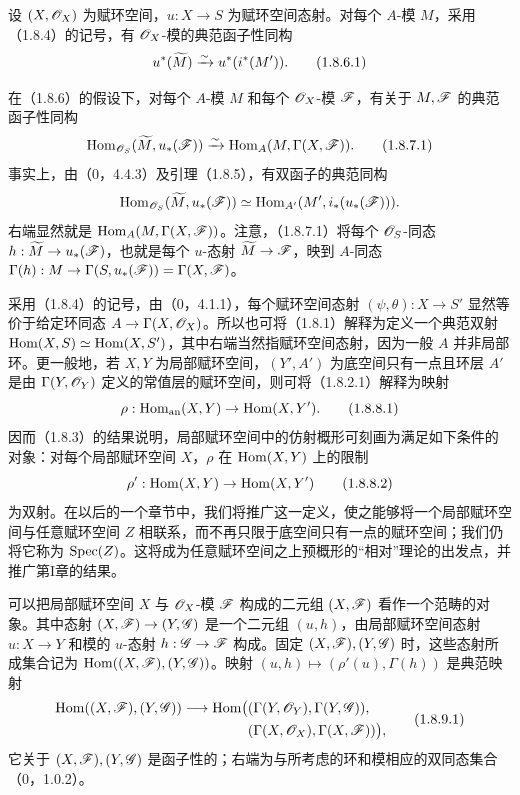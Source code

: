设 $(X,\mathscr O_X)$ 为赋环空间，$u:X\to S$ 为赋环空间态射。对每个 $A$-模 $M$，采用（1.8.4）的记号，有 $\mathscr O_X$-模的典范函子性同构
\begin{equation}u^*(\widetilde{M})\xrightarrow{\sim}u^*(i^*(M')).\tag{1.8.6.1}\end{equation}

在（1.8.6）的假设下，对每个 $A$-模 $M$ 和每个 $\mathscr O_X$-模 $\mathscr F$，有关于 $M,\mathscr F$ 的典范函子性同构
\begin{equation}
\operatorname{Hom}_{\mathscr O_S}(\widetilde{M},u_*(\mathscr F))\xrightarrow{\sim}
\operatorname{Hom}_A(M,\Gamma(X,\mathscr F)).\tag{1.8.7.1}
\end{equation}
事实上，由（0，4.4.3）及引理（1.8.5），有双函子的典范同构
\[
\operatorname{Hom}_{\mathscr O_S}(\widetilde{M},u_*(\mathscr F))\simeq
\operatorname{Hom}_{A'}(M',i_*(u_*(\mathscr F))).
\]
右端显然就是 $\operatorname{Hom}_A(M,\Gamma(X,\mathscr F))$。注意，（1.8.7.1）将每个 $\mathscr O_S$-同态 $h:\widetilde{M}\to u_*(\mathscr F)$，也就是每个 $u$-态射 $\widetilde{M}\to\mathscr F$，映到 $A$-同态
$\Gamma(h):M\to\Gamma(S,u_*(\mathscr F))=\Gamma(X,\mathscr F)$。

采用（1.8.4）的记号，由（0，4.1.1），每个赋环空间态射 $(\psi,\theta):X\to S'$ 显然等价于给定环同态 $A\to\Gamma(X,\mathscr O_X)$。所以也可将（1.8.1）解释为定义一个典范双射
$\operatorname{Hom}(X,S)\simeq\operatorname{Hom}(X,S')$，其中右端当然指赋环空间态射，因为一般 $A$ 并非局部环。更一般地，若 $X,Y$ 为局部赋环空间，$(Y',A')$ 为底空间只有一点且环层 $A'$ 是由 $\Gamma(Y,\mathscr O_Y)$ 定义的常值层的赋环空间，则可将（1.8.2.1）解释为映射
\begin{equation}\rho:\operatorname{Hom}_{\mathrm{an}}(X,Y)\to\operatorname{Hom}(X,Y').\tag{1.8.8.1}\end{equation}
因而（1.8.3）的结果说明，局部赋环空间中的仿射概形可刻画为满足如下条件的对象：对每个局部赋环空间 $X$，$\rho$ 在 $\operatorname{Hom}(X,Y)$ 上的限制
\begin{equation}\rho':\operatorname{Hom}(X,Y)\to\operatorname{Hom}(X,Y')\tag{1.8.8.2}\end{equation}
为双射。在以后的一个章节中，我们将推广这一定义，使之能够将一个局部赋环空间与任意赋环空间 $Z$ 相联系，而不再只限于底空间只有一点的赋环空间；我们仍将它称为 $\operatorname{Spec}(Z)$。这将成为任意赋环空间之上预概形的“相对”理论的出发点，并推广第I章的结果。

可以把局部赋环空间 $X$ 与 $\mathscr O_X$-模 $\mathscr F$ 构成的二元组 $(X,\mathscr F)$ 看作一个范畴的对象。其中态射 $(X,\mathscr F)\to(Y,\mathscr G)$ 是一个二元组 $(u,h)$，由局部赋环空间态射 $u:X\to Y$ 和模的 $u$-态射 $h:\mathscr G\to\mathscr F$ 构成。固定 $(X,\mathscr F),(Y,\mathscr G)$ 时，这些态射所成集合记为 $\operatorname{Hom}((X,\mathscr F),(Y,\mathscr G))$。映射 $(u,h)\mapsto(\rho'(u),\Gamma(h))$ 是典范映射
\begin{equation}
\begin{aligned}
\operatorname{Hom}((X,\mathscr F),(Y,\mathscr G))\longrightarrow
\operatorname{Hom}\bigl(& (\Gamma(Y,\mathscr O_Y),\Gamma(Y,\mathscr G)),\\
& (\Gamma(X,\mathscr O_X),\Gamma(X,\mathscr F))\bigr),
\end{aligned}\tag{1.8.9.1}
\end{equation}
它关于 $(X,\mathscr F),(Y,\mathscr G)$ 是函子性的；右端为与所考虑的环和模相应的双同态集合（0，1.0.2）。

